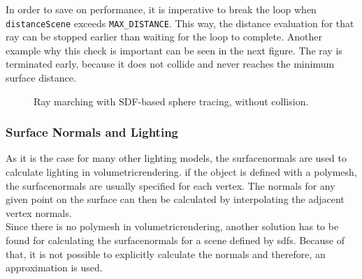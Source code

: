 \noindent
In order to save on performance, it is imperative to break the loop when \lstinline[language=HLSL]{distanceScene} exceeds \lstinline[language=HLSL]{MAX_DISTANCE}. This way, the distance evaluation for that ray can be stopped earlier than waiting for the loop to complete.
Another example why this check is important can be seen in the next figure. The ray is terminated early, because it does not collide and never reaches the minimum surface distance.
\begin{figure}[H]
    \centering
    \caption{Ray marching with SDF-based sphere tracing, without collision.}
\end{figure}

\clearpage
\subsubsection{Surface Normals and Lighting}
As it is the case for many other lighting models, the \gls{surfacenormal}s are used to calculate lighting in \gls{volumetricrendering}. 
if the object is defined with a \gls{polymesh}, the \gls{surfacenormal}s are usually specified for each vertex. The normals for any given point on the surface can then be calculated by interpolating the adjacent vertex normals. 
\\
Since there is no \gls{polymesh} in \gls{volumetricrendering}, another solution has to be found for calculating the \gls{surfacenormal}s for a scene defined by \gls{sdf}s.
Because of that, it is not possible to explicitly calculate the normals and therefore, an approximation is used. 

